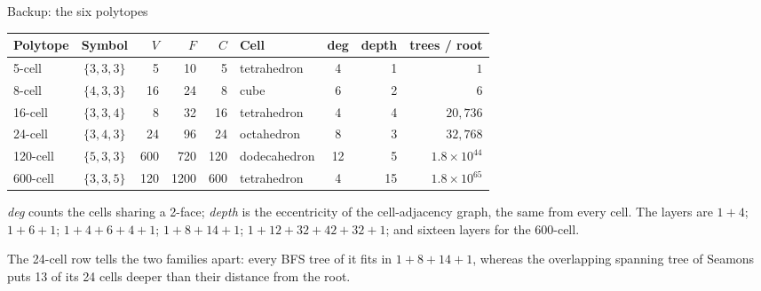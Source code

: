 \documentclass[aspectratio=43,11pt]{beamer}
\begin{document}
\begin{frame}{Backup: the six polytopes}
  \centering
  {\footnotesize\setlength{\tabcolsep}{3.5pt}
  \begin{tabular}{lcrrrlcrr}
    \toprule
    Polytope & Symbol & $V$ & $F$ & $C$ & Cell & deg & depth
      & trees / root\\
    \midrule
    5-cell   & $\{3,3,3\}$ &   5 &   10 &   5 & tetrahedron  & 4  & 1
      & $1$\\
    8-cell   & $\{4,3,3\}$ &  16 &   24 &   8 & cube         & 6  & 2
      & $6$\\
    16-cell  & $\{3,3,4\}$ &   8 &   32 &  16 & tetrahedron  & 4  & 4
      & $20{,}736$\\
    24-cell  & $\{3,4,3\}$ &  24 &   96 &  24 & octahedron   & 8  & 3
      & $32{,}768$\\
    120-cell & $\{5,3,3\}$ & 600 &  720 & 120 & dodecahedron & 12 & 5
      & $1.8\times10^{44}$\\
    600-cell & $\{3,3,5\}$ & 120 & 1200 & 600 & tetrahedron  & 4  & 15
      & $1.8\times10^{65}$\\
    \bottomrule
  \end{tabular}}

  \raggedright\smallskip
  {\small
  \emph{deg} counts the cells sharing a 2-face; \emph{depth} is the
  eccentricity of the cell-adjacency graph, the same
  from every cell. The layers are $1{+}4$; \; $1{+}6{+}1$; \;
  $1{+}4{+}6{+}4{+}1$; \; $1{+}8{+}14{+}1$; \;
  $1{+}12{+}32{+}42{+}32{+}1$; and sixteen layers for the 600-cell.

  The 24-cell row tells the two families apart: every BFS tree of it
  fits in $1{+}8{+}14{+}1$, whereas the overlapping spanning tree of
  Seamons puts 13 of its 24 cells deeper than their distance from the
  root.}
\end{frame}
\end{document}
